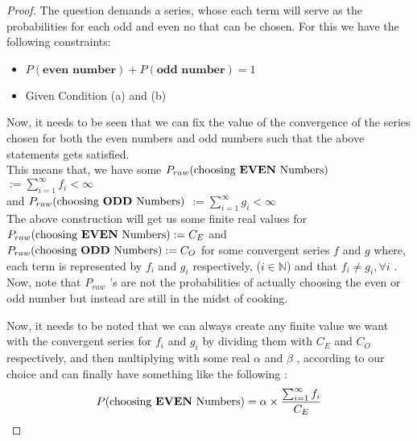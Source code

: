 \documentclass{article}
\begin{document}
\begin{proof}
    The question demands a series,  whose each term will serve as the probabilities for each odd and even no that can be chosen. For this we have the following constraints:
    \begin{itemize}
        \item $P(\textbf{even number}) + P(\textbf{odd number}) = 1$
        \item Given Condition (a) and (b) 
    \end{itemize}

Now, it needs to be seen that we can fix the value of the convergence of the series chosen for both the even numbers and odd numbers such that the above statements gets satisfied. \\
This means that, we have some $P_{raw}(\text{choosing \textbf{EVEN} Numbers})$ $:= \sum_{i=1}^{\infty} f_i < \infty$ \\
and $P_{raw}(\text{choosing \textbf{ODD} Numbers})$ $:= \sum_{i=1}^{\infty} g_i < \infty$ \\

The above construction will get us some finite real values for $P_{raw}(\text{choosing \textbf{EVEN} Numbers}) := C_E$ and $P_{raw}(\text{choosing \textbf{ODD} Numbers}) := C_O$ for some convergent series $f$ and  $g$ where, each term is represented by $f_i$ and $g_i$ respectively, ($i\in \mathbb{N}$) and that $f_i \neq g_i, \forall i$ . Now, note that $P_{raw}$ 's are not the probabilities of actually choosing the even or odd number but instead are still in the midst of cooking.

Now, it needs to be noted that we can always create any finite value we want with the convergent series for $f_i$ and $g_i$ by dividing them with $C_E$ and $C_O$ respectively, and then multiplying with some real $\alpha$ and $\beta$ , according to our choice and can finally have something like the following :
\[P(\text{choosing \textbf{EVEN} Numbers}) = \alpha \times \frac{\sum_{i=1}^{\infty} f_i}{C_E}\]



    
\end{proof}
\end{document}
